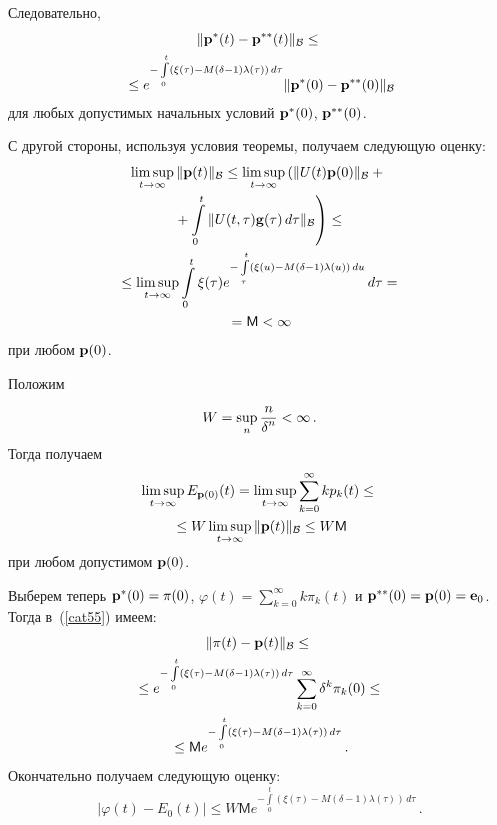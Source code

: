 \begin{multicols}{2}
Следовательно,
\begin{multline}
\|{\bf p^*}(t) - {\bf p^{**}}(t)\|_{\cal B}  \le {}\\
{}\le e^{-\int\limits_0^t
\left(\xi(\tau)- M\left(\delta -1\right)\lambda(\tau)\right)\,
d\tau}\|{\bf p^*}(0) - {\bf p^{**}}(0)\|_{\cal B}
\label{cat55}
\end{multline}
для любых допустимых начальных условий ${\bf p^*}(0)$, 
${\bf p^{**}}(0)$.

С другой стороны, используя условия теоремы, получаем следующую оценку:
\begin{multline*}
\limsup\limits_{t \to \infty} \|{\bf p}(t)\|_{\cal B} \le
\limsup\limits_{t \to \infty} \left( \|U(t){\bf p}(0) \|_{\cal B} +{}\right.\\
\left.{}+ \int\limits_0^t \| U(t,\tau){\bf g}(\tau)\, d\tau \|_{\cal
 B}\right) \le {} \\
 {}\le
\limsup\limits_{t \to \infty} \int\limits_0^t \xi(\tau)
e^{-\int\limits_{\tau}^t \left(\xi(u)- M\left(\delta
-1\right)\lambda(u)\right) \, du} \, d\tau ={}\\
{}= \textsf{M} < \infty
\end{multline*}
при любом ${\bf p}(0)$.

Положим
\begin{equation*}
W = \sup_{n}\displaystyle\frac{\displaystyle n\mathstrut}{\displaystyle \delta^n\mathstrut} < \infty\,. 
\end{equation*}
Тогда получаем
\begin{multline*}
\limsup\limits_{t \to \infty} E_{{\mathbf p}(0)}(t) =  \limsup\limits_{t \to
\infty} \sum_{k=0}^{\infty} kp_k(t) \le{}\\
{}\le W \limsup\limits_{t \to
\infty} \|{\bf p}(t)\|_{\cal B} \le  W \textsf{M} 
\end{multline*}
при любом допустимом ${\mathbf p}(0)$.

Выберем теперь ${\bf p^*}(0) = {\bf \pi}(0)$, $\varphi(t) =
\sum\limits_{k=0}^{\infty}k\pi_k(t)$ и ${\bf p^{**}}(0) = {\bf p}(0)
= {\bf e}_0$. Тогда в~(\ref{cat55}) имеем:
\begin{multline*}
\|{\bf \pi}(t) - {\bf p}(t)\|_{\cal B}  \le{}\\
{}\le  e^{-\int\limits_0^t
\left(\xi(\tau)- M\left(\delta -1\right)\lambda(\tau)\right)\,
d\tau} \sum_{k=0}^{\infty} \delta^k \pi_k(0) \le{}\\
{}\le  \textsf{M}
e^{-\int\limits_0^t \left(\xi(\tau)- M\left(\delta
-1\right)\lambda(\tau)\right)\, d\tau} \,. 
\end{multline*}
Окончательно получаем следующую оценку:
\begin{equation}
|\varphi (t) - E_0(t)| \le  W \textsf{M} e^{-\int\limits_0^t
\left(\xi(\tau)- M\left(\delta -1\right)\lambda(\tau)\right)\,
d\tau} \,. 
\label{cat591}
\end{equation}


\end{multicols}
